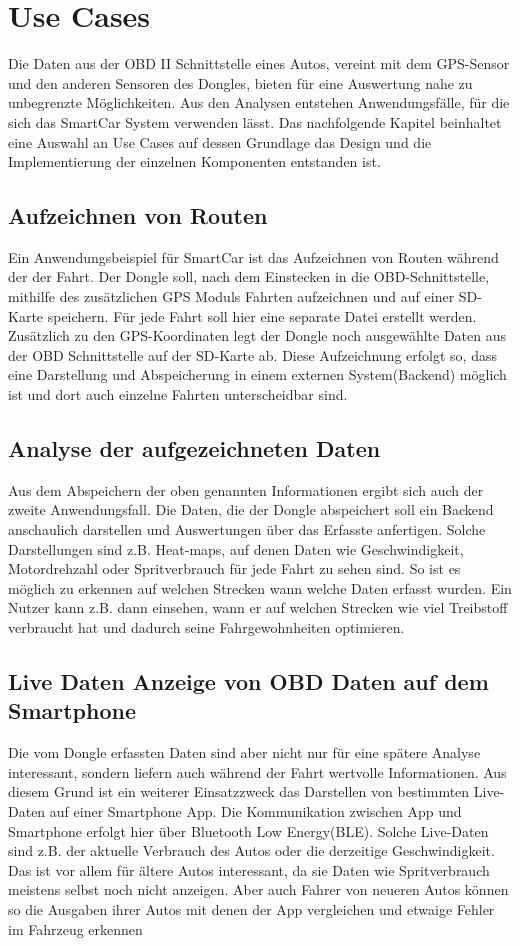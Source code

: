 \chapter{Use Cases}
\label{sec:useCases}
Die Daten aus der OBD II Schnittstelle eines Autos, vereint mit dem GPS-Sensor und den anderen Sensoren des Dongles, bieten für eine Auswertung nahe zu unbegrenzte Möglichkeiten. Aus den Analysen entstehen Anwendungsfälle, für die sich das SmartCar System verwenden lässt. Das nachfolgende Kapitel beinhaltet eine Auswahl an Use Cases auf dessen Grundlage das Design und die Implementierung der einzelnen Komponenten entstanden ist.
\section{Aufzeichnen von Routen}
Ein Anwendungsbeispiel für SmartCar ist das Aufzeichnen von Routen während der der Fahrt. Der Dongle soll, nach dem Einstecken in die OBD-Schnittstelle, mithilfe des zusätzlichen GPS Moduls Fahrten aufzeichnen und auf einer SD-Karte speichern. Für jede Fahrt soll hier eine separate Datei erstellt werden. Zusätzlich zu den GPS-Koordinaten legt der Dongle noch ausgewählte Daten aus der OBD Schnittstelle auf der SD-Karte ab. Diese Aufzeichnung erfolgt so, dass eine Darstellung und Abspeicherung in einem externen System(Backend) möglich ist und dort auch einzelne Fahrten unterscheidbar sind.
\section{Analyse der aufgezeichneten Daten}
\label{Sec_AnayseDerAufgezeichnetenDaten}
Aus dem Abspeichern der oben genannten Informationen ergibt sich auch der zweite Anwendungsfall. Die Daten, die der Dongle abspeichert soll ein Backend anschaulich darstellen und Auswertungen über das Erfasste anfertigen. Solche Darstellungen sind z.B. Heat-maps, auf denen Daten wie Geschwindigkeit, Motordrehzahl oder Spritverbrauch für jede Fahrt zu sehen sind. So ist es möglich zu erkennen auf welchen Strecken wann welche Daten erfasst wurden. Ein Nutzer kann z.B. dann einsehen, wann er auf welchen Strecken wie viel Treibstoff verbraucht hat und dadurch seine Fahrgewohnheiten optimieren.
\section{Live Daten Anzeige von OBD Daten auf dem Smartphone}
Die vom Dongle erfassten Daten sind aber nicht nur für eine spätere Analyse interessant, sondern liefern auch während der Fahrt wertvolle Informationen. Aus diesem Grund ist ein weiterer Einsatzzweck das Darstellen von bestimmten Live-Daten auf einer Smartphone App. Die Kommunikation zwischen App und Smartphone erfolgt hier über Bluetooth Low Energy(BLE). Solche Live-Daten sind z.B. der aktuelle Verbrauch des Autos oder die derzeitige Geschwindigkeit. Das ist vor allem für ältere Autos interessant, da sie Daten wie Spritverbrauch meistens selbst noch nicht anzeigen. Aber auch Fahrer von neueren Autos können so die Ausgaben ihrer Autos mit denen der App vergleichen und etwaige Fehler im Fahrzeug erkennen
 